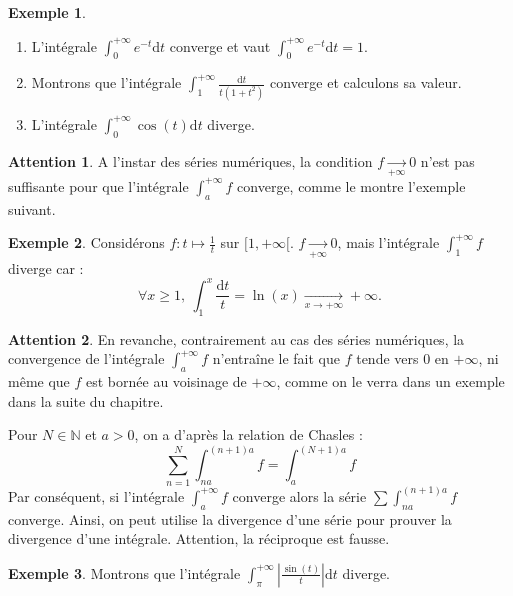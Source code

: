 \documentclass[french]{article}
\newcommand{\N}{\mathbb{N}}
\renewcommand{\d}{\text{d}}
\theoremstyle{plain}
\theoremstyle{definition}
\newtheorem*{ex}{Exemple}
\newtheorem*{attention}{Attention}
\theoremstyle{remark}
\begin{document}
\begin{ex}
	\begin{enumerate}
		\item L'intégrale $\displaystyle\int_{0}^{+\infty}e^{-t}\d t$ converge et vaut $\displaystyle\int_{0}^{+\infty}e^{-t}\d t=1$.
		\item Montrons que l'intégrale $\displaystyle\int_{1}^{+\infty}\frac{\d t}{t(1+t^2)}$ converge et calculons sa valeur. %
		\item L'intégrale $\displaystyle\int_{0}^{+\infty}\cos(t)\d t$ diverge. %
	\end{enumerate}
\end{ex}

\begin{attention}
	A l'instar des séries numériques, la condition $f\xrightarrow[+\infty]{}0$ n'est pas suffisante pour que l'intégrale $\displaystyle\int_{a}^{+\infty}f$ converge, comme le montre l'exemple suivant.
\end{attention}

\begin{ex}
	Considérons $f:t\mapsto\displaystyle\frac{1}{t}$ sur $[1,+\infty[$. $f\xrightarrow[+\infty]{}0$, mais l'intégrale $\displaystyle\int_{1}^{+\infty}f$ diverge car :
	$$\forall x\geqslant1,\ \int_{1}^{x}\frac{\d t}{t}=\ln(x)\xrightarrow[x\to +\infty]{}+\infty.$$
\end{ex}

\begin{attention}
	En revanche, contrairement au cas des séries numériques, la convergence de l'intégrale $\displaystyle\int_{a}^{+\infty}f$ n'entraîne le fait que $f$ tende vers $0$ en $+\infty$, ni même que $f$ est bornée au voisinage de $+\infty$, comme on le verra dans un exemple dans la suite du chapitre.
\end{attention}

\begin{met}
	Pour $N\in\N$ et $a>0$, on a d'après la relation de Chasles : $$\sum_{n=1}^{N}\int_{na}^{(n+1)a}f=\int_{a}^{(N+1)a}f$$ Par conséquent, si l'intégrale $\displaystyle\int_{a}^{+\infty} f$ converge alors la série $\displaystyle\sum \int_{na}^{(n+1)a}f$ converge. Ainsi, on peut utilise la divergence d'une série pour prouver la divergence d'une intégrale. Attention, la réciproque est fausse.
\end{met}

\begin{ex}
	Montrons que l'intégrale $\displaystyle\int_{\pi}^{+\infty}\left\lvert\frac{\sin(t)}{t}\right\rvert \d t$ diverge.
\end{ex}
\end{document}
